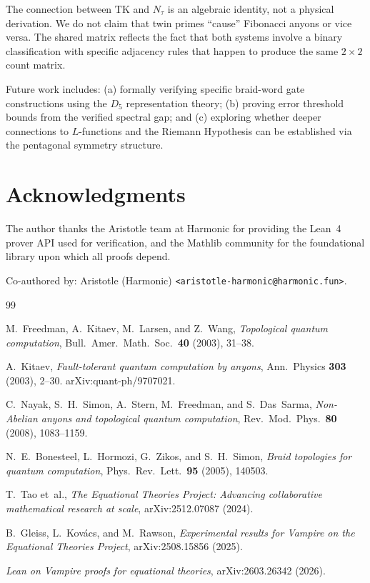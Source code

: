 \documentclass[11pt,a4paper]{article}
\begin{document}
The connection between $\mathrm{TK}$ and $N_\tau$ is an algebraic identity,
not a physical derivation. We do not claim that twin primes ``cause'' Fibonacci
anyons or vice versa. The shared matrix reflects the fact that both systems
involve a binary classification with specific adjacency rules that happen to
produce the same $2 \times 2$ count matrix.

Future work includes: (a) formally verifying specific braid-word gate
constructions using the $D_5$ representation theory; (b) proving error
threshold bounds from the verified spectral gap; and (c) exploring whether
deeper connections to $L$-functions and the Riemann Hypothesis can be
established via the pentagonal symmetry structure.

\section*{Acknowledgments}

The author thanks the Aristotle team at Harmonic for providing the Lean~4
prover API used for verification, and the Mathlib community for the
foundational library upon which all proofs depend.

Co-authored by: Aristotle (Harmonic) \texttt{<aristotle-harmonic@harmonic.fun>}.

\begin{thebibliography}{99}

M.~Freedman, A.~Kitaev, M.~Larsen, and Z.~Wang,
\emph{Topological quantum computation},
Bull.\ Amer.\ Math.\ Soc.\ \textbf{40} (2003), 31--38.

A.~Kitaev,
\emph{Fault-tolerant quantum computation by anyons},
Ann.\ Physics \textbf{303} (2003), 2--30.
arXiv:quant-ph/9707021.

C.~Nayak, S.~H.~Simon, A.~Stern, M.~Freedman, and S.~Das~Sarma,
\emph{Non-Abelian anyons and topological quantum computation},
Rev.\ Mod.\ Phys.\ \textbf{80} (2008), 1083--1159.

N.~E.~Bonesteel, L.~Hormozi, G.~Zikos, and S.~H.~Simon,
\emph{Braid topologies for quantum computation},
Phys.\ Rev.\ Lett.\ \textbf{95} (2005), 140503.

T.~Tao et~al.,
\emph{The Equational Theories Project: Advancing collaborative mathematical research at scale},
arXiv:2512.07087 (2024).

B.~Gleiss, L.~Kov\'{a}cs, and M.~Rawson,
\emph{Experimental results for Vampire on the Equational Theories Project},
arXiv:2508.15856 (2025).

\emph{Lean on Vampire proofs for equational theories},
arXiv:2603.26342 (2026).

\end{thebibliography}
\end{document}
